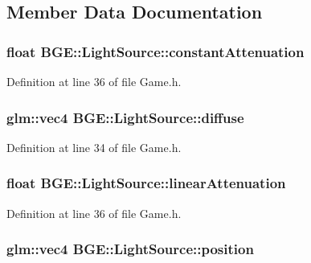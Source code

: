 \subsection{Member Data Documentation}
\hypertarget{struct_b_g_e_1_1_light_source_a9dc7cb4becd1804de3a34331dd5c5eaf}{
\subsubsection[{constant\-Attenuation}]{\setlength{\rightskip}{0pt plus 5cm}float B\-G\-E\-::\-Light\-Source\-::constant\-Attenuation}}\label{struct_b_g_e_1_1_light_source_a9dc7cb4becd1804de3a34331dd5c5eaf}


Definition at line 36 of file Game.\-h.

\hypertarget{struct_b_g_e_1_1_light_source_a6b4fb0c330f4406c5bd4e6464302032a}{
\subsubsection[{diffuse}]{\setlength{\rightskip}{0pt plus 5cm}glm\-::vec4 B\-G\-E\-::\-Light\-Source\-::diffuse}}\label{struct_b_g_e_1_1_light_source_a6b4fb0c330f4406c5bd4e6464302032a}


Definition at line 34 of file Game.\-h.

\hypertarget{struct_b_g_e_1_1_light_source_aea595573245115130d4d5f2ccdebecc1}{
\subsubsection[{linear\-Attenuation}]{\setlength{\rightskip}{0pt plus 5cm}float B\-G\-E\-::\-Light\-Source\-::linear\-Attenuation}}\label{struct_b_g_e_1_1_light_source_aea595573245115130d4d5f2ccdebecc1}


Definition at line 36 of file Game.\-h.

\hypertarget{struct_b_g_e_1_1_light_source_a31af9cd6a4686eeaacdb990150512cc3}{
\subsubsection[{position}]{\setlength{\rightskip}{0pt plus 5cm}glm\-::vec4 B\-G\-E\-::\-Light\-Source\-::position}}\label{struct_b_g_e_1_1_light_source_a31af9cd6a4686eeaacdb990150512cc3}


